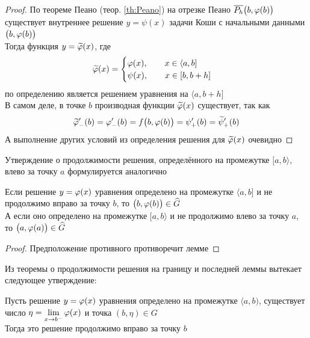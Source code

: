 \begin{proof}
    По теореме Пеано (теор. \ref{th:Peano}) на отрезке Пеано $ \overline{P_h} \big( b, \varphi(b) \big) $ существует внутреннее решение $ y = \psi(x) $ задачи Коши с начальными данными $ \big( b, \varphi(b) \big) $ \\
    Тогда функция $ y = \widetilde{\varphi}(x) $, где
    $$ \widetilde{\varphi}(x) =
    \begin{cases}
        \varphi(x), \qquad x \in \langle a, b] \\
        \psi(x), \qquad x \in [b, b + h]
    \end{cases} $$
    по определению является решением уравнения  на $ \langle a, b + h] $ \\
    В самом деле, в точке $ b $ производная функции $ \widetilde{\varphi}(x) $ существует, так как
    $$ \widetilde{\varphi}_-'(b) = \varphi_-'(b) = f \big( b, \varphi(b) \big) = \psi_+'(b) = \widetilde\psi_+'(b) $$
    А выполнение других условий из определения решения для $ \widetilde{\varphi}(x) $ очевидно
\end{proof}

Утверждение о продолжимости решения, определённого на промежутке $ [a, b \rangle $, влево за точку $ a $ формулируется аналогично

\begin{implication}
    Если решение $ y = \varphi(x) $ уравнения  определено на промежутке $ \langle a, b] $ и не продолжимо вправо за точку $ b $, то $ \big( b, \varphi(b) \big) \in \widehat{G} $ \\
    А если оно определено на промежутке $ [a, b \rangle $ и не продолжимо влево за точку $ a $, то $ \big( a, \varphi(a) \big) \in \widehat{G} $
\end{implication}

\begin{proof}
	Предположение противного противоречит лемме
\end{proof}

Из теоремы о продолжимости решения на границу и последней леммы вытекает следующее утверждение:

\begin{lemma}
    Пусть решение $ y = \varphi(x) $ уравнения  определено на промежутке $ \langle a, b) $, существует число $ \eta = \lim\limits_{x \to b^-}\varphi(x) $ и точка $ (b, \eta) \in G $ \\
    Тогда это решение продолжимо вправо за точку $ b $
\end{lemma}

